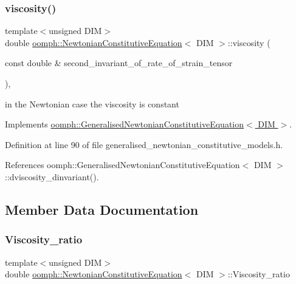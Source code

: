 \subsubsection{\texorpdfstring{viscosity()}{viscosity()}}
{\footnotesize\ttfamily template$<$unsigned D\+IM$>$ \\
double \hyperlink{classoomph_1_1NewtonianConstitutiveEquation}{oomph\+::\+Newtonian\+Constitutive\+Equation}$<$ D\+IM $>$\+::viscosity (\begin{DoxyParamCaption}\item[{const double \&}]{second\+\_\+invariant\+\_\+of\+\_\+rate\+\_\+of\+\_\+strain\+\_\+tensor }\end{DoxyParamCaption})\hspace{0.3cm}{\ttfamily [inline]}, {\ttfamily [virtual]}}



in the Newtonian case the viscosity is constant 



Implements \hyperlink{classoomph_1_1GeneralisedNewtonianConstitutiveEquation_a3e6d811786e39ca3c3a9b1c46249442f}{oomph\+::\+Generalised\+Newtonian\+Constitutive\+Equation$<$ D\+I\+M $>$}.



Definition at line 90 of file generalised\+\_\+newtonian\+\_\+constitutive\+\_\+models.\+h.



References oomph\+::\+Generalised\+Newtonian\+Constitutive\+Equation$<$ D\+I\+M $>$\+::dviscosity\+\_\+dinvariant().



\subsection{Member Data Documentation}
\mbox{\label{classoomph_1_1NewtonianConstitutiveEquation_a3c00cad22057ad703ce1b7f169cdc713}} 
\subsubsection{\texorpdfstring{Viscosity\+\_\+ratio}{Viscosity\_ratio}}
{\footnotesize\ttfamily template$<$unsigned D\+IM$>$ \\
double \hyperlink{classoomph_1_1NewtonianConstitutiveEquation}{oomph\+::\+Newtonian\+Constitutive\+Equation}$<$ D\+IM $>$\+::Viscosity\+\_\+ratio\hspace{0.3cm}{\ttfamily [private]}}



